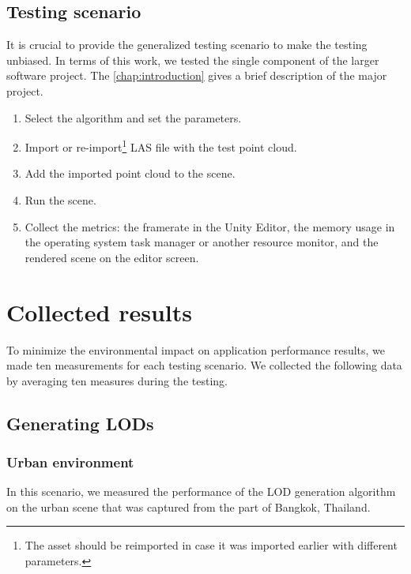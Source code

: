 \subsection{Testing scenario}

It is crucial to provide the generalized testing scenario to make the testing unbiased. In terms of this work, we tested the single component of the larger software project. The \autoref{chap:introduction} gives a brief description of the major project.

\begin{enumerate}
    \item Select the algorithm and set the parameters.
    \item Import or re-import\footnote{The asset should be reimported in case it was imported earlier with different parameters.} LAS file with the test point cloud.
    \item Add the imported point cloud to the scene.
    \item Run the scene.
    \item Collect the metrics: the framerate in the Unity Editor, the memory usage in the operating system task manager or another resource monitor, and the rendered scene on the editor screen.
\end{enumerate}


\section{Collected results}

To minimize the environmental impact on application performance results, we made ten measurements for each testing scenario. We collected the following data by averaging ten measures during the testing.

\subsection{Generating LODs}

\subsubsection{Urban environment}

In this scenario, we measured the performance of the LOD generation algorithm on the urban scene that was captured from the part of Bangkok, Thailand.



